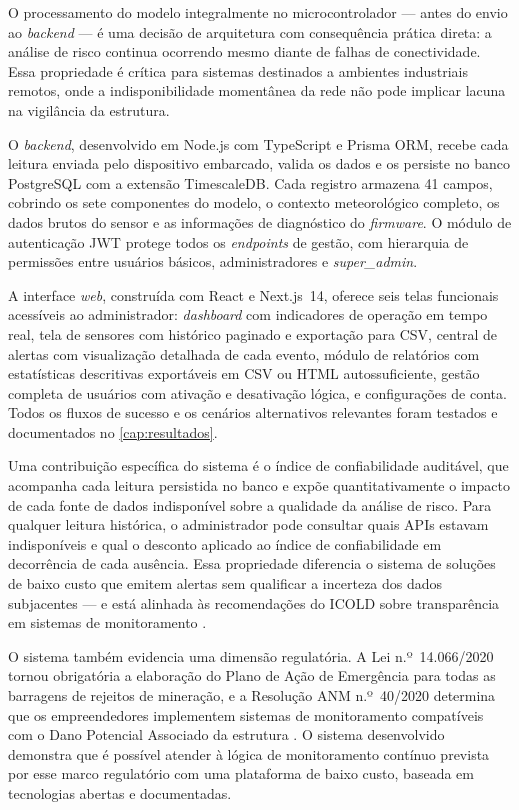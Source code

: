 O processamento do modelo integralmente no microcontrolador --- antes do
envio ao \textit{backend} --- é uma decisão de arquitetura com
consequência prática direta: a análise de risco continua ocorrendo mesmo
diante de falhas de conectividade. Essa propriedade é crítica para
sistemas destinados a ambientes industriais remotos, onde a
indisponibilidade momentânea da rede não pode implicar lacuna na
vigilância da estrutura.

O \textit{backend}, desenvolvido em Node.js com TypeScript e Prisma ORM,
recebe cada leitura enviada pelo dispositivo embarcado, valida os dados
e os persiste no banco PostgreSQL com a extensão TimescaleDB. Cada
registro armazena 41 campos, cobrindo os sete componentes do modelo, o
contexto meteorológico completo, os dados brutos do sensor e as
informações de diagnóstico do \textit{firmware}. O módulo de
autenticação JWT protege todos os \textit{endpoints} de gestão, com
hierarquia de permissões entre usuários básicos, administradores e
\textit{super\_admin}.

A interface \textit{web}, construída com React e Next.js~14, oferece seis
telas funcionais acessíveis ao administrador: \textit{dashboard} com
indicadores de operação em tempo real, tela de sensores com histórico
paginado e exportação para CSV, central de alertas com visualização
detalhada de cada evento, módulo de relatórios com estatísticas
descritivas exportáveis em CSV ou HTML autossuficiente, gestão completa
de usuários com ativação e desativação lógica, e configurações de
conta. Todos os fluxos de sucesso e os cenários alternativos relevantes
foram testados e documentados no \autoref{cap:resultados}.

Uma contribuição específica do sistema é o índice de confiabilidade
auditável, que acompanha cada leitura persistida no banco e expõe
quantitativamente o impacto de cada fonte de dados indisponível sobre
a qualidade da análise de risco. Para qualquer leitura histórica, o
administrador pode consultar quais APIs estavam indisponíveis e qual
o desconto aplicado ao índice de confiabilidade em decorrência de cada
ausência. Essa propriedade diferencia o sistema de soluções de baixo
custo que emitem alertas sem qualificar a incerteza dos dados
subjacentes --- e está alinhada às recomendações do ICOLD sobre
transparência em sistemas de monitoramento \cite{icold2022tailings}.

O sistema também evidencia uma dimensão regulatória. A Lei
n.º~14.066/2020 tornou obrigatória a elaboração do Plano de Ação de
Emergência para todas as barragens de rejeitos de mineração, e a
Resolução ANM n.º~40/2020 determina que os empreendedores implementem
sistemas de monitoramento compatíveis com o Dano Potencial Associado da
estrutura \cite{brasil2020lei14066, anm2021resolucao56}. O sistema
desenvolvido demonstra que é possível atender à lógica de monitoramento
contínuo prevista por esse marco regulatório com uma plataforma de
baixo custo, baseada em tecnologias abertas e documentadas.

